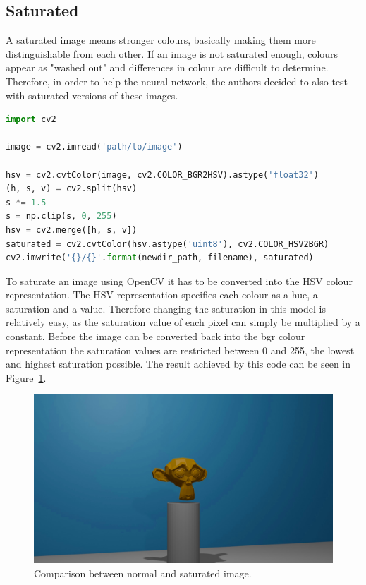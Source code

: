 \subsection{Saturated}
A saturated image means stronger colours, basically making them more distinguishable from each other. If an image is not saturated enough, colours appear as "washed out" and differences in colour are difficult to determine. Therefore, in order to help the neural network, the authors decided to also test with saturated versions of these images.

\begin{lstlisting}[language=python]
import cv2

image = cv2.imread('path/to/image')

hsv = cv2.cvtColor(image, cv2.COLOR_BGR2HSV).astype('float32')
(h, s, v) = cv2.split(hsv)
s *= 1.5
s = np.clip(s, 0, 255)
hsv = cv2.merge([h, s, v])
saturated = cv2.cvtColor(hsv.astype('uint8'), cv2.COLOR_HSV2BGR)
cv2.imwrite('{}/{}'.format(newdir_path, filename), saturated)
\end{lstlisting}

To saturate an image using OpenCV it has to be converted into the HSV colour representation. The HSV representation specifies each colour as a hue, a saturation and a value. Therefore changing the saturation in this model is relatively easy, as the saturation value of each pixel can simply be multiplied by a constant. Before the image can be converted back into the bgr colour representation the saturation values are restricted between 0 and 255, the lowest and highest saturation possible. The result achieved by this code can be seen in Figure~\ref{pic:implementation_opencv_saturated}.

\begin{figure}[h!]
	\centering
	\includegraphics[width=4.5in]{img/implementation_opencv_saturated.jpg}
	\caption{Comparison between normal and saturated image.}
	\label{pic:implementation_opencv_saturated}
\end{figure}

